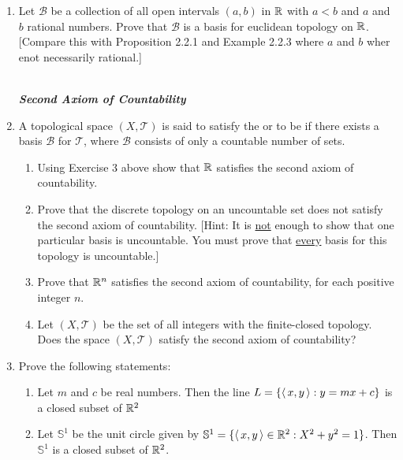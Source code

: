 \documentclass[10pt,a4paper]{report}
\newcommand{\SPECIAL}[1]{\begin{center}
	{\Large \textbf{\textit{\\#1}} }
\end{center}
}
\newcommand{\BB}{\mathcal{B}}
\newcommand{\TT}{\mathcal{T}}
\begin{document}
\begin{enumerate}
\begin{enumerate}[label=(\roman*)]
\end{enumerate}

\item Let $\BB$ be a collection of all open intervals $(a,b)$ in $\mathbb{R}$ with $a < b$ and $a$ and $b$ rational numbers.  Prove that $\BB$ is a basis for euclidean topology on $\mathbb{R}$.[Compare this with Proposition 2.2.1 and Example 2.2.3 where $a$ and $b$ wher enot necessarily rational.]

\SPECIAL{Second Axiom of Countability}

\item A topological space $(X, \TT)$ is said to satisfy the  or to be  if there exists a basis $\BB$ for $\TT$, where $\BB$ consists of only a countable number of sets.

\begin{enumerate}[label=(\roman*)]

	\item Using Exercise 3 above show that $\mathbb{R}$ satisfies the second axiom of countability.
	
	\item Prove that the discrete topology on an uncountable set does not satisfy the second axiom of countability. [Hint: It is \underline{not} enough to show that one particular basis is uncountable.  You must prove that \underline{every} basis for this topology is uncountable.]
	
	\item Prove that $\mathbb{R}^n$ satisfies the second axiom of countability, for each positive integer $n$.
	
	\item Let $(X, \TT)$ be the set of all integers with the finite-closed topology.  Does the space $(X, \TT)$ satisfy the second axiom of countability?
	
\end{enumerate}

\item Prove the following statements:

\begin{enumerate}[label=(\roman*)]
\newcommand{\SSS}{\mathbb{S}}
	\item Let $m$ and $c$ be real numbers.  Then the line $L=\{\left \langle\, x,y \,\right \rangle: y=mx+c\}$ is a closed subset of $\mathbb{R}^2$
	
	\item Let $\SSS^1$ be the unit circle given by $\SSS^1 = \{\ABRACKET{x,y} \in \R^2 : X^2+y^2=1\}$.  Then $\SSS^1$ is a closed subset of $\mathbb{R}^2$.
	

\end{enumerate}
\end{enumerate}
\end{document}
